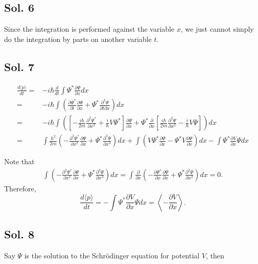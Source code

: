 \subsection*{Sol. 6}
Since the integration is performed against the variable $x$, we just cannot simply do the integration by parts on another variable $t$.

\subsection*{Sol. 7}

\begin{align*}
    \frac{d\langle p\rangle}{dt}
    = & -i\hbar \frac{d}{dt}\int\Psi^*\frac{\partial \Psi}{\partial x}dx\\
    = & -i\hbar\int\left( 
    \frac{\partial \Psi^*}{\partial t}\frac{\partial \Psi}{\partial x}
    + \Psi^*\frac{\partial^2 \Psi}{\partial t\partial x}
    \right) dx\\
    = & 
    -i\hbar\int\left( 
    \left[
    -\frac{i\hbar}{2m}
    \frac{\partial^2\Psi^*}{\partial x^2}
    + \frac{i}{\hbar}V\Psi^*
    \right]
    \frac{\partial \Psi}{\partial x}
    + \Psi^*
    \frac{\partial}{\partial x}
    \left[
    \frac{i\hbar}{2m}
    \frac{\partial^2\Psi}{\partial x^2}
    - \frac{i}{\hbar}V\Psi
    \right]
    \right)dx\\
    =&\int \frac{\hbar^2}{2m}
    \left(-\frac{\partial^2\Psi^*}{\partial x^2}\frac{\partial\Psi}{\partial x} + \Psi^*\frac{\partial^3\Psi}{\partial x^3}\right) dx+
    \int \left( V\Psi^* \frac{\partial \Psi}{\partial x} 
     - \Psi^* V \frac{\partial\Psi}{\partial x}
    \right)dx - 
    \int \Psi^*\frac{\partial V}{\partial x} \Psi dx
\end{align*}

Note  that 
\begin{align*}
    \int \left(-\frac{\partial^2\Psi^*}{\partial x^2}\frac{\partial\Psi}{\partial x} + \Psi^*\frac{\partial^3\Psi}{\partial x^3}\right) dx
    =
    \int \frac{\partial}{\partial x}\left(-\frac{\partial \Psi^*}{\partial x}\frac{\partial \Psi}{\partial x} + \Psi^*\frac{\partial^2 \Psi}{\partial x^2}\right)dx = 0.
\end{align*}
Therefore, $$
\frac{d\langle p\rangle }{dt}
= -\int\Psi^*\frac{\partial V}{\partial x}\Psi dx =
\left\langle - \frac{\partial V}{\partial x} \right\rangle.
$$

\subsection*{Sol. 8}
Say $\Psi$ is the solution to the Schrödinger equation for potential $V$, then

